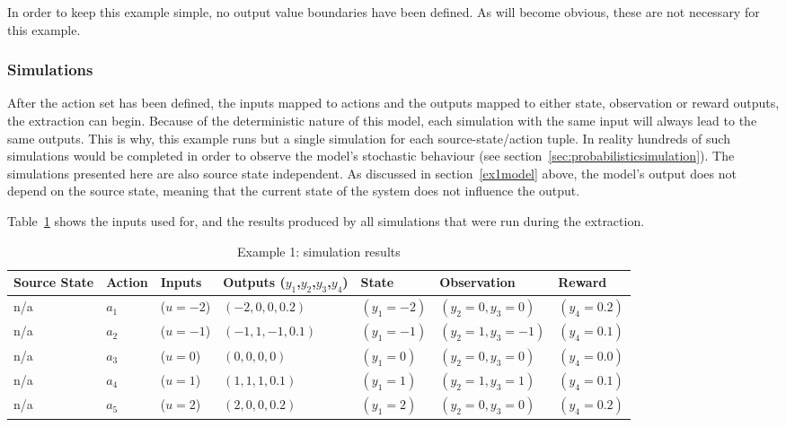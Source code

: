 In order to keep this example simple, no output value boundaries have been defined. As will become obvious, these are not necessary for this example.

\subsubsection{Simulations}

After the action set has been defined, the inputs mapped to actions and the outputs mapped to either state, observation or reward outputs, the extraction can begin. Because of the deterministic nature of this model, each simulation with the same input will always lead to the same outputs. This is why, this example runs but a single simulation for each source-state/action tuple. In reality hundreds of such simulations would be completed in order to observe the model's stochastic behaviour (see section~\ref{sec:probabilisticsimulation}). The simulations presented here are also source state independent. As discussed in section~\ref{ex1model} above, the model's output does not depend on the source state, meaning that the current state of the system does not influence the output.

Table~\ref{ex1simres} shows the inputs used for, and the results produced by all simulations that were run during the extraction.

\begin{table}
\begin{center}
    \begin{tabular}{ | l | l | l | l | l | l | l |}
    \hline
Source State & Action & Inputs & Outputs ($y_1$,$y_2$,$y_3$,$y_4$) & State      & Observation      & Reward \\ \hline
    n/a      & $a_1$  & ($u=-2$)     & $(-2,0,0,0.2)$                    & $(y_1=-2)$ & $(y_2=0,y_3=0)$  & $(y_4=0.2)$ \\ \hline
    n/a      & $a_2$  & ($u=-1$)     & $(-1,1,-1,0.1)$                   & $(y_1=-1)$ & $(y_2=1,y_3=-1)$ & $(y_4=0.1)$ \\ \hline
    n/a      & $a_3$  & ($u=0$)      & $(0,0,0,0)$                       & $(y_1=0)$  & $(y_2=0,y_3=0)$  & $(y_4=0.0)$ \\ \hline
    n/a      & $a_4$  & ($u=1$)      & $(1,1,1,0.1)$                     & $(y_1=1)$  & $(y_2=1,y_3=1)$  & $(y_4=0.1)$ \\ \hline
    n/a      & $a_5$  & ($u=2$)      & $(2,0,0,0.2)$                     & $(y_1=2)$  & $(y_2=0,y_3=0)$  & $(y_4=0.2)$ \\ \hline
\end{tabular}
\caption{Example 1: simulation results}
\label{ex1simres}
\end{center}
\end{table}


